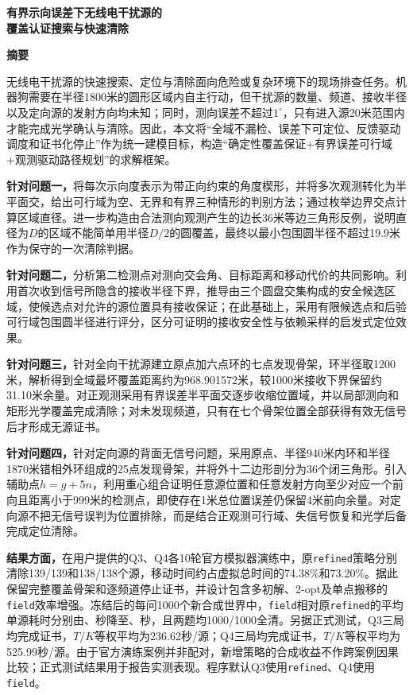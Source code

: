 \documentclass[UTF8,fontset=fandol,a4paper,zihao=-4]{ctexart}
\begin{document}
\begin{center}
{\LARGE\bfseries 有界示向误差下无线电干扰源的\\覆盖认证搜索与快速清除\par}
\vspace{0.6em}
\end{center}
\begin{center}\bfseries 摘要\end{center}
无线电干扰源的快速搜索、定位与清除面向危险或复杂环境下的现场排查任务。机器狗需要在半径1800米的圆形区域内自主行动，但干扰源的数量、频道、接收半径以及定向源的发射方向均未知；同时，测向误差不超过$1^\circ$，只有进入源20米范围内才能完成光学确认与清除。因此，本文将“全域不漏检、误差下可定位、反馈驱动调度和证书化停止”作为统一建模目标，构造“确定性覆盖保证+有界误差可行域+观测驱动路径规划”的求解框架。

\par\noindent\textbf{针对问题一，}将每次示向度表示为带正向约束的角度楔形，并将多次观测转化为半平面交，给出可行域为空、无界和有界三种情形的判别方法；通过枚举边界交点计算区域直径。进一步构造由合法测向观测产生的边长36米等边三角形反例，说明直径为$D$的区域不能简单用半径$D/2$的圆覆盖，最终以最小包围圆半径不超过19.9米作为保守的一次清除判据。

\par\noindent\textbf{针对问题二，}分析第二检测点对测向交会角、目标距离和移动代价的共同影响。利用首次收到信号所隐含的接收半径下界，推导由三个圆盘交集构成的安全候选区域，使候选点对允许的源位置具有接收保证；在此基础上，采用有限候选点和后验可行域包围圆半径进行评分，区分可证明的接收安全性与依赖采样的启发式定位效果。

\par\noindent\textbf{针对问题三，}针对全向干扰源建立原点加六点环的七点发现骨架，环半径取1200米，解析得到全域最坏覆盖距离约为968.901572米，较1000米接收下界保留约31.10米余量。对正观测采用有界误差半平面交逐步收缩位置域，并以局部测向和矩形光学覆盖完成清除；对未发现频道，只有在七个骨架位置全部获得有效无信号后才形成无源证书。

\par\noindent\textbf{针对问题四，}针对定向源的背面无信号问题，采用原点、半径940米内环和半径1870米错相外环组成的25点发现骨架，并将外十二边形剖分为36个闭三角形。引入辅助点$h=g+5n$，利用重心组合证明任意源位置和任意发射方向至少对应一个前向且距离小于999米的检测点，即使存在1米总位置误差仍保留4米前向余量。对定向源不把无信号误判为位置排除，而是结合正观测可行域、失信号恢复和光学后备完成定位清除。

\par\noindent\textbf{结果方面，}在用户提供的Q3、Q4各10轮官方模拟器演练中，原\texttt{refined}策略分别清除139/139和138/138个源，移动时间约占虚拟总时间的74.38\%和73.20\%。据此保留完整覆盖骨架和逐频道停止证书，并设计包含多初解、2-opt及单点搬移的\texttt{field}效率增强。冻结后的每问1000个新合成世界中，\texttt{field}相对原\texttt{refined}的平均单源耗时分别由\FieldQThreeControl{}、\FieldQFourControl{}秒降至\FieldQThreeTime{}、\FieldQFourTime{}秒，且两题均1000/1000全清。另据正式测试，Q3三局均完成证书，$T/K$等权平均为236.62秒/源；Q4三局均完成证书，$T/K$等权平均为525.99秒/源。由于官方演练案例并非配对，新增策略的合成收益不作跨案例因果比较；正式测试结果用于报告实测表现。程序默认Q3使用\texttt{refined}、Q4使用\texttt{field}。
\end{document}
